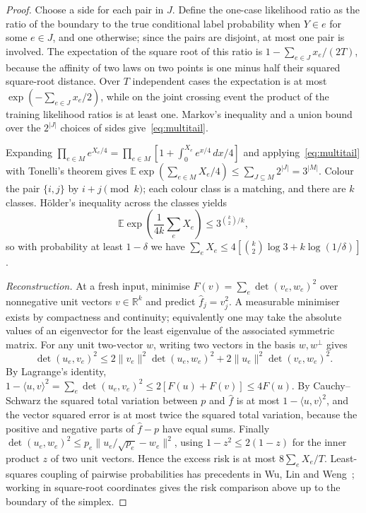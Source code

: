 \documentclass[11pt,a4paper]{article}
\theoremstyle{remark}
\newcommand{\E}{\mathbb E}
\begin{document}
\begin{proof}
Choose a side for each pair in $J$. Define the one-case likelihood ratio as the ratio of the boundary to the true conditional label probability when $Y\in e$ for some $e\in J$, and one otherwise; since the pairs are disjoint, at most one pair is involved. The expectation of the square root of this ratio is $1-\sum_{e\in J}x_e/(2T)$, because the affinity of two laws on two points is one minus half their squared square-root distance. Over $T$ independent cases the expectation is at most $\exp(-\sum_{e\in J}x_e/2)$, while on the joint crossing event the product of the training likelihood ratios is at least one. Markov's inequality and a union bound over the $2^{|J|}$ choices of sides give~\eqref{eq:multitail}.

Expanding $\prod_{e\in M}e^{X_e/4}=\prod_{e\in M}[1+\int_0^{X_e}e^{x/4}\,dx/4]$ and applying~\eqref{eq:multitail} with Tonelli's theorem gives $\E\exp(\sum_{e\in M}X_e/4)\le\sum_{J\subseteq M}2^{|J|}=3^{|M|}$. Colour the pair $\{i,j\}$ by $i+j\pmod k$; each colour class is a matching, and there are $k$ classes. Hölder's inequality across the classes yields
\[
 \E\exp\!\left(\frac{1}{4k}\sum_e X_e\right)
       \le 3^{\binom{k}{2}/k},
\]
so with probability at least $1-\delta$ we have $\sum_eX_e\le4[\binom{k}{2}\log3+k\log(1/\delta)]$.

\emph{Reconstruction.}
At a fresh input, minimise $F(v)=\sum_e\det(v_e,w_e)^2$ over nonnegative unit vectors $v\in\mathbb R^k$ and predict $\widehat f_j=v_j^2$. A measurable minimiser exists by compactness and continuity; equivalently one may take the absolute values of an eigenvector for the least eigenvalue of the associated symmetric matrix. For any unit two-vector $w$, writing two vectors in the basis $w,w^\perp$ gives
\[
 \det(u_e,v_e)^2\le
  2\|v_e\|^2\det(u_e,w_e)^2+
  2\|u_e\|^2\det(v_e,w_e)^2 .
\]
By Lagrange's identity, $1-\langle u,v\rangle^2=\sum_e\det(u_e,v_e)^2\le2[F(u)+F(v)]\le4F(u)$. By Cauchy--Schwarz the squared total variation between $p$ and $\widehat f$ is at most $1-\langle u,v\rangle^2$, and the vector squared error is at most twice the squared total variation, because the positive and negative parts of $\widehat f-p$ have equal sums. Finally $\det(u_e,w_e)^2\le p_e\|u_e/\sqrt{p_e}-w_e\|^2$, using $1-z^2\le2(1-z)$ for the inner product $z$ of two unit vectors. Hence the excess risk is at most $8\sum_eX_e/T$. Least-squares coupling of pairwise probabilities has precedents in Wu, Lin and Weng~\cite{wulw}; working in square-root coordinates gives the risk comparison above up to the boundary of the simplex.
\end{proof}
\end{document}
